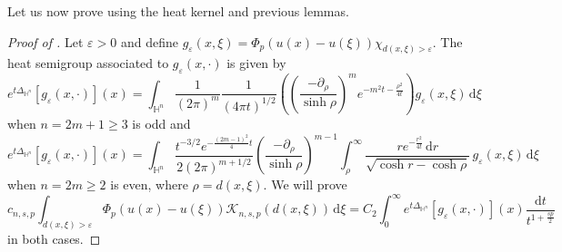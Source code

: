 \documentclass[11pt]{amsart}
\theoremstyle{plain}
\theoremstyle{definition}
\numberwithin{equation}{section}
\begin{document}
Let us now prove  using the heat kernel and previous lemmas.

\begin{proof} [Proof of ]
Let $\varepsilon > 0$ and define $g_{\varepsilon}(x,\xi) = \Phi_{p}(u(x)-u(\xi)) \chi_{d(x,\xi) > \varepsilon}$. The heat semigroup associated to $g_{\varepsilon}(x, \cdot)$ is given by
\begin{equation*}
e^{t\Delta_{\mathbb{H}^{n}}} [g_{\varepsilon}(x,\cdot)](x) = \int_{\mathbb{H}^{n}} \frac{1}{(2\pi)^{m}} \frac{1}{(4\pi t)^{1/2}} \left( \left( \frac{-\partial_{\rho}}{\sinh \rho} \right)^{m} e^{-m^{2} t-\frac{\rho^2}{4t}} \right) g_{\varepsilon}(x,\xi) \,\mathrm{d}\xi
\end{equation*}
when $n=2m+1 \geq 3$ is odd and
\begin{equation*}
e^{t\Delta_{\mathbb{H}^{n}}} [g_{\varepsilon}(x,\cdot)](x) = \int_{\mathbb{H}^{n}} \frac{t^{-3/2} e^{-\frac{(2m-1)^2}{4}t}}{2(2\pi)^{m+1/2}} \left( \frac{-\partial_{\rho}}{\sinh \rho} \right)^{m-1} \int_{\rho}^{\infty} \frac{r e^{-\frac{r^2}{4t}} \,\mathrm{d}r}{\sqrt{\cosh r-\cosh \rho}} \, g_{\varepsilon}(x, \xi) \,\mathrm{d}\xi
\end{equation*}
when $n=2m \geq 2$ is even, where $\rho = d(x,\xi)$. We will prove
\begin{equation} \label{eq:truncated}
c_{n, s, p} \int_{d(x, \xi) > \varepsilon} \Phi_p(u(x)-u(\xi)) \mathcal{K}_{n,s,p}(d(x,\xi)) \,\mathrm{d}\xi = C_{2} \int_{0}^{\infty} e^{t\Delta_{\mathbb{H}^{n}}}[g_{\varepsilon}(x,\cdot)](x) \frac{\mathrm{d}t}{t^{1+\frac{sp}{2}}}
\end{equation}
in both cases. 


\end{proof}
\end{document}
